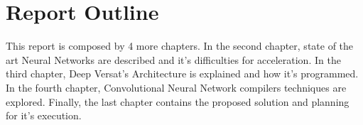 


\section{Report Outline}
\label{reportoutline}

This report is composed by 4 more chapters. In the second chapter,
 state of the art Neural Networks are described  and it's difficulties for acceleration.
 In the third chapter, Deep Versat's Architecture is explained and how it's programmed.
 In the fourth chapter, Convolutional Neural Network compilers techniques are explored. Finally, the
 last chapter contains the proposed solution and planning for it's execution.



